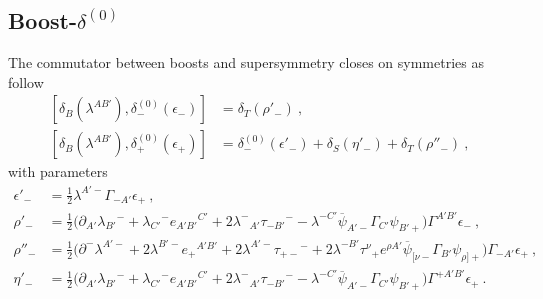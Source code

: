 \documentclass[a4paper,10pt,openany]{article}
\begin{document}
	\subsection[Boost-$\delta^{(0)}$]{Boost-\boldmath $\delta^{(0)}$}
	The commutator between boosts and supersymmetry closes on symmetries as follow
	\begin{subequations}
		\begin{align}
			[\delta_{B}(\lambda^{AB'}),\delta^{(0)}_{-}(\epsilon_{-})]&=\delta_{T}(\rho'_{-})\ , \\
			[\delta_{B}(\lambda^{AB'}),\delta^{(0)}_{+}(\epsilon_{+})]&=\delta^{(0)}_{-}(\epsilon'_{-})+\delta_{S}(\eta'_{-})+\delta_{T}(\rho''_{-})\ ,
		\end{align}
	\end{subequations}
	with parameters
	\begin{subequations}
		\begin{align}
			\epsilon'_{-}&=\frac{1}{2}\lambda^{A'-}\Gamma_{-A'}\epsilon_{+}\ , \\
			\rho'_{-}&=\frac{1}{2}\Big(\partial_{A'}\lambda_{B'}{}^{-}+\lambda_{C'}{}^{-}e_{A'B'}{}^{C'}+2\lambda^{-}{}_{A'}\tau_{-B'}{}^{-}-\lambda^{-C'}\overline{\psi}_{A' -}\Gamma_{C'}\psi_{B' +}\Big)\Gamma^{A'B'}\epsilon_{-}\ , \\
			\rho''_{-}&=\frac{1}{2}\Big(\partial^{-}\lambda^{A'-}+2\lambda^{B'-}e_{+}{}^{A'B'}+2\lambda^{A'-}\tau_{+-}{}^{-}+2\lambda^{-B'}\tau^{\nu}{}_{+}e^{\rho A'}\overline{\psi}_{[\nu -}\Gamma_{B'}\psi_{\rho] +}\Big)\Gamma_{-A'}\epsilon_{+}\ , \\
			\eta'_{-}&=\frac{1}{2}\Big(\partial_{A'}\lambda_{B'}{}^{-}  +\lambda_{C'}{}^{-}e_{A'B'}{}^{C'}+2\lambda^{-}{}_{A'}\tau_{-B'}{}^{-}-\lambda^{-C'}\overline{\psi}_{A'-}\Gamma_{C'}\psi_{B'+}\Big)\Gamma^{+A'B'}\epsilon_{+}\ .
		\end{align}
	\end{subequations}
	
	
	
\end{document}
